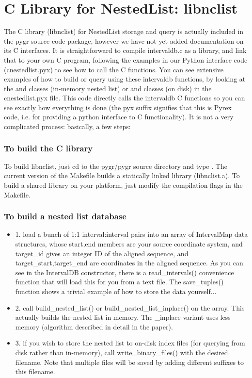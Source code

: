 \documentclass{howto}
\begin{document}
\section{C Library for NestedList: libnclist}
\label{intervaldb-doc}

The C library (libnclist) for NestedList storage and query
is actually included in the pygr source code package,
however we have not yet added documentation on its C interfaces.
It is straightforward to compile intervaldb.c as a library, 
and link that to your own C program, following the examples in 
our Python interface code (cnestedlist.pyx) to see how to call the C functions.
You can see extensive examples of how to build or query using these intervaldb functions, by looking at the  and  classes (in-memory nested list) or  and  classes (on disk) in the cnestedlist.pyx file.  This code directly calls the intervaldb C functions so you can see exactly how everything is done (the pyx suffix signifies that this is Pyrex code, i.e. for providing a python interface to C functionality).  It is not a very complicated process: basically, a few steps:

\subsubsection{To build the C library}
To build libnclist, just cd to the pygr/pygr source directory and type .
The current version of the Makefile builds a statically linked library (libnclist.a).  
To build a shared library on your platform, just modify the compilation flags
in the Makefile.

\subsubsection{To build a nested list database}
\begin{itemize}
\item 1. load a bunch of 1:1 interval:interval pairs into an array of IntervalMap data structures, whose start,end members are your source coordinate system, and target_id gives an integer ID of the aligned sequence, and target_start,target_end are coordinates in the aligned sequence.  As you can see in the IntervalDB constructor, there is a read_intervals() convenience function that will load this for you from a text file.  The save_tuples() function shows a trivial example of how to store the data yourself...

\item 2. call build_nested_list() or build_nested_list_inplace() on the array.  This actually builds the nested list in memory.  The _inplace variant uses less memory (algorithm described in detail in the paper).

\item 3. if you wish to store the nested list to on-disk index files (for querying from disk rather than in-memory), call write_binary_files() with the desired filename.  Note that multiple files will be saved by adding different suffixes to this filename.
\end{itemize}
\end{document}
